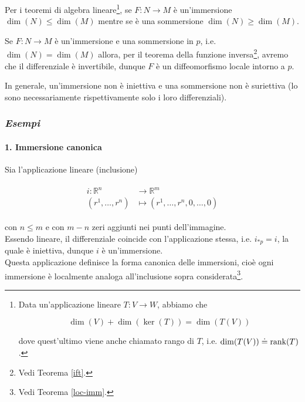 \begin{remark}
	Per i teoremi di algebra lineare\footnote{%
		Data un'applicazione lineare $ T : V \to W $, abbiamo che
		
		\begin{equation}
			\dim(V) + \dim(\ker(T)) = \dim(T(V))
		\end{equation}
		
		dove quest'ultimo viene anche chiamato rango di $ T $, i.e. $ \dim(T(V)) \doteq \rank(T) $.%
	}, se $ F : N \to M $ è un'immersione $ \dim(N) \leqslant \dim(M) $ mentre se è una sommersione $ \dim(N) \geqslant \dim(M) $.
\end{remark}

\begin{remark}
	Se $ F : N \to M $ è un'immersione e una sommersione in $ p $, i.e. $ \dim(N) = \dim(M) $ allora, per il teorema della funzione inversa\footnote{%
		Vedi Teorema \ref{ift}.%
	}, avremo che il differenziale è invertibile, dunque $ F $ è un diffeomorfismo locale intorno a $ p $.
\end{remark}

\begin{remark}
	In generale, un'immersione non è iniettiva e una sommersione non è suriettiva (lo sono necessariamente rispettivamente solo i loro differenziali).
\end{remark}

\subsubsection{\textit{Esempi}}

\paragraph{1. Immersione canonica}

Sia l'applicazione lineare (inclusione)

\begin{align}
	\begin{split}
		i : \mathbb{R}^{n} &\to \mathbb{R}^{m}\\
		(r^{1},\dots,r^{n}) &\mapsto (r^{1},\dots,r^{n},0,\dots,0)
	\end{split}
\end{align}

con $ n \leqslant m $ e con $ m-n $ zeri aggiunti nei punti dell'immagine.\\
Essendo lineare, il differenziale coincide con l'applicazione stessa, i.e. $ i_{*p} = i $, la quale è iniettiva, dunque $ i $ è un'immersione.\\
Questa applicazione definisce la forma canonica delle immersioni, cioè ogni immersione è localmente analoga all'inclusione sopra considerata\footnote{%
	Vedi Teorema \ref{loc-imm}.%
}.

